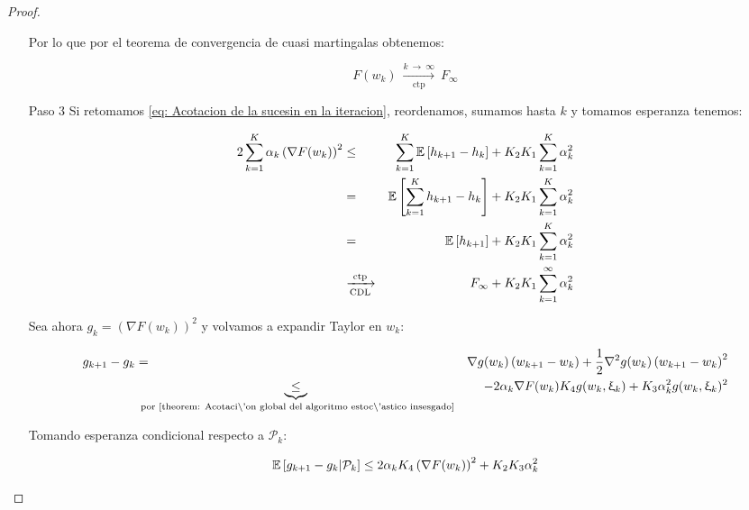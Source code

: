 \begin{proof}
\begin{enumerate}
		  Por lo que por el teorema de convergencia de cuasi martingalas obtenemos:
		 
		 \begin{equation}
		 F(w_k) \ \xrightarrow[\text{ctp}]{k \ \rightarrow \ \infty } \ F_{\infty}
		 \end{equation}
		 
		 \item[Paso 3] Si retomamos \ref{eq: Acotacion de la sucesin en la iteracion}, reordenamos, sumamos hasta $k$ y tomamos esperanza tenemos: 
		 
		 \begin{equation}
		 \label{eq: los gradientes ponderados son sumables en caso no convexo ctp}
		 	\begin{aligned}
		 	2\sum\limits_{k=1}^{K} {\alpha_k \left(\nabla F(w_k)\right)^2} & \leq & \sum\limits_{k=1}^{K} {\mathbb{E} \left[h_{k+1} - h_k\right]} + K_2K_1 \sum\limits_{k=1}^{K} {\alpha_k^2} \\
		 	& = & \mathbb{E} \left[\sum\limits_{k=1}^{K} {h_{k+1} - h_k}\right] + K_2K_1 \sum\limits_{k=1}^{K} {\alpha_k^2} \\
		 	& = & \mathbb{E} \left[h_{k+1}\right] + K_2K_1 \sum\limits_{k=1}^{K} {\alpha_k^2} \\
		 	& \xrightarrow[\text{CDL}]{\text{ ctp }} & F_{\infty} + K_2K_1 \sum\limits_{k=1}^{\infty} {\alpha_k^2}
		 	\end{aligned}
		 \end{equation}
		 
		 
		 Sea ahora $g_k = \left(\nabla F (w_k)\right)^2$ y volvamos a expandir Taylor en $w_k$:
		 
		 \begin{equation*}
		 \begin{aligned}
		 g_{k+1} - g_k & = & \nabla g(w_k) \left(w_{k+1} - w_k\right) + \frac{1}{2} \nabla^2 g(w_k) \left(w_{k+1} - w_k\right)^2 \\
		 &\underbrace{\leq}_{\text{ por \ref{theorem: Acotaci\'on global del algoritmo estoc\'astico insesgado}}} & - 2 \alpha_k \nabla F(w_k) K_4 g(w_k, \upxi_{k}) + K_3 \alpha_k^2 g(w_k, \upxi_{k})^2 \\
		 \end{aligned}
		 \end{equation*}
		 
		 Tomando esperanza condicional respecto a $\mathcal{P}_k$:
		 
		 \begin{equation}
		 	\mathbb{E} \left[{g_{k+1} - g_k } \vert \mathcal{P}_{k}\right] \leq 2 \alpha_k K_4 \left(\nabla F(w_k)\right)^2 + K_2K_3\alpha_k^2
		 \end{equation}
		 

\end{enumerate}
\end{proof}
